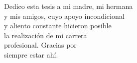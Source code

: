 \begin{dedication}

    Dedico esta tesis a mi madre, mi hermana \\ 
    y mis amigos, cuyo apoyo incondicional \\ 
    y aliento constante hicieron posible \\
    la realización de mi carrera \\
    profesional. Gracias por \\
    siempre estar ahí.
    
\end{dedication}